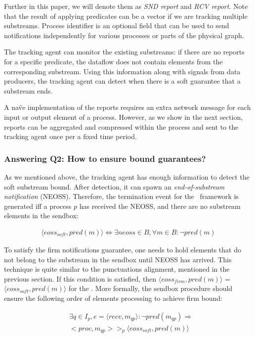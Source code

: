 Further in this paper, we will denote them as {\em SND report} and {\em RCV report}. Note that the result of applying predicates can be a vector if we are tracking multiple substreams. Process identifier is an optional field that can be used to send notifications independently for various processes or parts of the physical graph.

The tracking agent can monitor the existing substreams: if there are no reports for a specific predicate, the dataflow does not contain elements from the corresponding substream. Using this information along with signals from data producers, the tracking agent can detect when there is a soft guarantee that a substream ends.

A na\"ve implementation of the reports requires an extra network message for each input or output element of a process. However, as we show in the next section, reports can be aggregated and compressed within the process and sent to the tracking agent once per a fixed time period.

\subsubsection{Answering Q2: How to ensure bound guarantees?}

As we mentioned above, the tracking agent has enough information to detect the soft substream bound. After detection, it can spawn an {\em end-of-substream notification} (NEOSS). Therefore, the termination event for the \tracker\ framework is generated iff a process $p$ has received the NEOSS, and there are no substream elements in the sendbox:

\begin{align*}
\langle eoss_{soft}, pred(m)\rangle \Longleftrightarrow \exists neoss \in B, \forall m\in B : \neg pred(m)
\end{align*}

To satisfy the firm notifications guarantee, one needs to hold elements that do not belong to the substream in the sendbox until NEOSS has arrived. This technique is quite similar to the punctuations alignment, mentioned in the previous section. If this condition is satisfied, then $\langle eoss_{firm}, pred(m)\rangle$ = $\langle eoss_{soft}, pred(m)\rangle$ for the \tracker. More formally, the sendbox procedure should ensure the following order of elements processing to achieve firm bound:

\begin{align*}
& \exists q \in I_p, e = \langle recv,m_{qp} \rangle : \neg pred(m_{qp}) \Longrightarrow \\ 
& <proc, m_{qp}> >_p \langle eoss_{soft}, pred(m)\rangle
\end{align*} 

